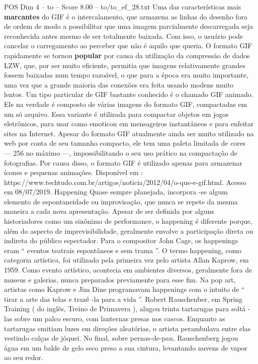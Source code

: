 \begin{textsample}{POS Dim 4 – to – Score 8.00 – to/to\_ef\_28.txt}
Uma das características mais \textbf{marcantes} do GIF é o intercalamento, que armazena as linhas do desenho fora de ordem de modo a possibilitar que uma imagem parcialmente descarregada seja reconhecida antes mesmo de ser totalmente baixada.
Com isso, o usuário pode cancelar o carregamento ao perceber que não é aquilo que queria.
O formato GIF rapidamente se tornou \textbf{popular} por causa da utilização da compressão de dados LZW, que, por ser muito eficiente, permitia que imagens relativamente grandes fossem baixadas num tempo razoável, o que para a época era muito importante, uma vez que a grande maioria das conexões era feita usando modens muito lentos.
Um tipo particular de GIF bastante conhecido é o chamado GIF animado.
Ele na verdade é composto de várias imagens do formato GIF, compactadas em um só arquivo.
Essa variante é utilizada para compactar objetos em jogos eletrônicos, para usar como emoticon em mensageiros instantâneos e para enfeitar sites na Internet.
Apesar do formato GIF atualmente ainda ser muito utilizado na web por conta de seu tamanho compacto, ele tem uma paleta limitada de cores — 256 no máximo —, impossibilitando o seu uso prático na compactação de fotografias.
Por causa disso, o formato GIF é utilizado apenas para armazenar ícones e pequenas animações.
Disponível em : https://www.techtudo.com.br/artigos/noticia/2012/04/o-que-e-gif.html.
Acesso em 08/07/2019.
Happening Quase sempre planejada, incorpora -se algum elemento de espontaneidade ou improvisação, que nunca se repete da mesma maneira a cada nova apresentação.
Apesar de ser definida por alguns historiadores como um sinônimo de performance, o happening é diferente porque, além do aspecto de imprevisibilidade, geralmente envolve a participação direta ou indireta do público espectador.
Para o compositor John Cage, os happenings eram “ eventos teatrais espontâneos e sem trama ”.
O termo happening, como categoria artística, foi utilizado pela primeira vez pelo artista Allan Kaprow, em 1959.
Como evento artístico, acontecia em ambientes diversos, geralmente fora de museus e galerias, nunca preparados previamente para esse fim.
Na pop art, artistas como Kaprow e Jim Dine programavam happenings com o intuito de “ tirar a arte das telas e trazê -la para a vida ”.
Robert Rauschenber, em Spring Training ( do inglês, Treino de Primavera ), alugou trinta tartarugas para soltá -las sobre um palco escuro, com lanternas presas nos cascos.
Enquanto as tartarugas emitiam luzes em direções aleatórias, o artista perambulava entre elas vestindo calças de jóquei.
No final, sobre pernas-de-pau, Rauschenberg jogou água em um balde de gelo seco preso a sua cintura, levantando nuvens de vapor ao seu redor.

\end{textsample}
